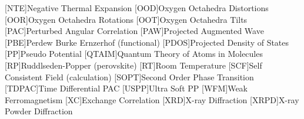 \begin{multicols}{3}[]
\begin{scriptsize}
\begin{acronym}
                    [NTE]{Negative Thermal Expansion}
                    [OOD]{Oxygen Octahedra Dis\-tor\-tions}
                    [OOR]{Oxygen Octahedra Ro\-ta\-tions}
                    [OOT]{Oxygen Octahedra Tilts}
                    [PAC]{Perturbed Angular Correlation}
                    [PAW]{Projected Augmented Wave}
                    [PBE]{Perdew Burke Ernzerhof (functional)}
                    [PDOS]{Projected Density of States}
                    [PP]{Pseudo Potential}
                    [QTAIM]{Quantum Theory of Atoms in Molecules}
                    [RP]{Ruddlseden-Popper (perovskite)}
                    [RT]{Room Temperature}
                    [SCF]{Self Consistent Field (calculation)}
                    [SOPT]{Second Order Phase Transition}
                    [TDPAC]{Time Differential PAC}
                    [USPP]{Ultra Soft PP}
                    [WFM]{Weak Ferromagnetism}
                    [XC]{Exchange Correlation}
                    [XRD]{X-ray Diffraction}
                    [XRPD]{X-ray Powder Diffraction}
		\end{acronym}
	\end{scriptsize}
\end{multicols}
\clearemptydoublepage
